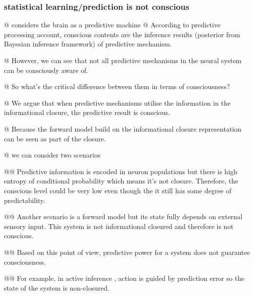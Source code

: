 \documentclass[utf8]{article}
\newenvironment{ants}
			{
			 \begin{easylist}[itemize]
			}
			{
			\end{easylist}
			}
\newcommand{\needref}[1]{%
			\ifthenelse{\equal{#1}{}}{%
				\todo[color=White, linecolor=BlueViolet]{\textcolor{BlueViolet}{Ref}}}{%
				\todo[color=White, linecolor=BlueViolet]{\textcolor{BlueViolet}{Ref: #1}}%
				}%
		}
\begin{document}
			\subsubsection{statistical learning/prediction is not conscious}
				\begin{ants}
					@ considers the brain as a predictive machine
					@ According to predictive processing account, conscious contents are the inference results (posterior from Bayesian inference framework) of predictive mechanism. 
					
					@ However, we can see that not all predictive mechanisms in the neural system can be consciously aware of. 
					
					@ So what's the critical difference between them in terms of consciousness?
					
					@ We argue that when predictive mechanisms utilise the information in the informational closure, the predictive result is conscious. 
					
					@ Because the forward model build on the informational closure representation can be seen as part of the closure. 
					
					
					@ we can consider two scenarios
						
						@@ Predictive information is encoded in neuron populations but there is high entropy of conditional probability which means it's not closure. Therefore, the conscious level could be very low even though the it still has some degree of predictability. 
						
						@@ Another scenario is a forward model but its state fully depends on external sensory input. This system is not informational closured and therefore is not conscious. 
						
						@@ Based on this point of view, predictive power for a system does not guarantee consciousness. 
						
						@@ For example, in active inference \needref{active inference}, action is guided by prediction error so the state of the system is non-closured. 
					
				\end{ants}
				
			
\end{document}
